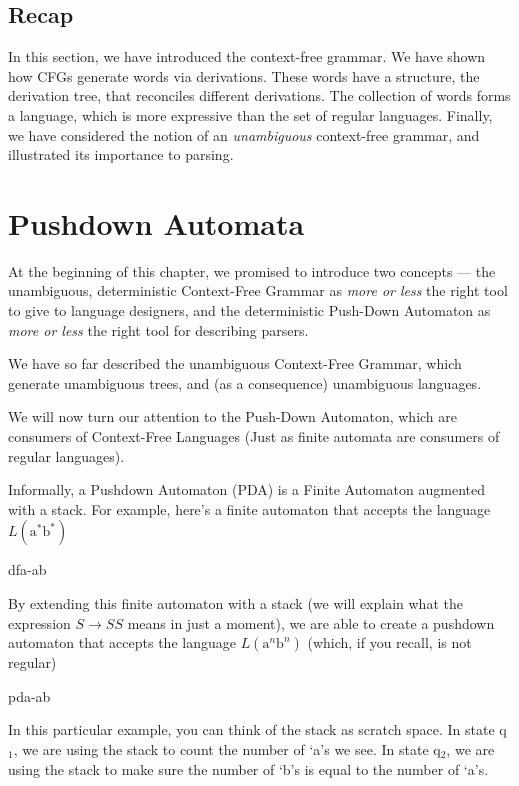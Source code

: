 \subsection{Recap}
In this section, we have introduced the context-free grammar. We have shown how CFGs generate words via derivations. These words have a structure, the derivation tree, that reconciles different derivations. The collection of words forms a language, which is more expressive than the set of regular languages. Finally, we have considered the notion of an \textit{unambiguous} context-free grammar, and illustrated its importance to parsing.

\section{Pushdown Automata}\label{section:pushdownautomata}
At the beginning of this chapter, we promised to introduce two concepts --- the unambiguous, deterministic Context-Free Grammar as \textit{more or less} the right tool to give to language designers, and the deterministic Push-Down Automaton as \textit{more or less} the right tool for describing parsers.

We have so far described the unambiguous Context-Free Grammar, which generate unambiguous trees, and (as a consequence) unambiguous languages. 

We will now turn our attention to the Push-Down Automaton, which are consumers of Context-Free Languages (Just as finite automata are consumers of regular languages). 

Informally, a Pushdown Automaton (PDA) is a Finite Automaton augmented with a stack. For example, here's a finite automaton that accepts the language $L(\text{a}^*\text{b}^*)$
\begin{center}
    {dfa-ab}
\end{center}
By extending this finite automaton with a stack (we will explain what the expression $S \to SS$ means in just a moment), we are able to create a pushdown automaton that accepts the language $L(\text{a}^n\text{b}^n)$ (which, if you recall, is not regular)
\begin{center}
    {pda-ab}
\end{center}

In this particular example, you can think of the stack as scratch space. In state q$_1$, we are using the stack to count the number of `a's we see. In state q$_2$, we are using the stack to make sure the number of `b's is equal to the number of `a's.

